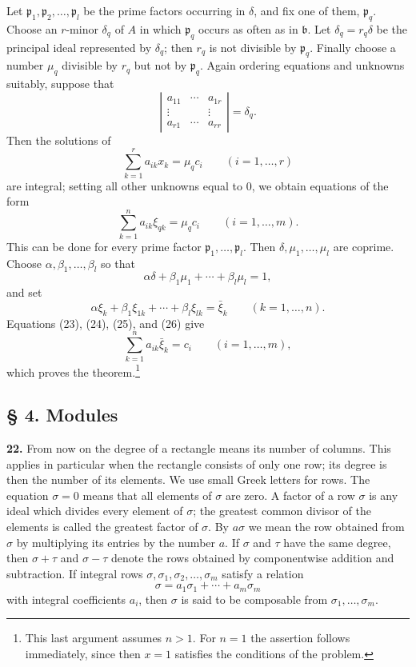 \documentclass[11pt,a4paper]{article}
\begin{document}
Let \(\mathfrak p_1,\mathfrak p_2,\ldots,\mathfrak p_l\) be the prime factors occurring in \(\delta\), and fix one of them, \(\mathfrak p_q\). Choose an \(r\)-minor \(\delta_q\) of \(A\) in which \(\mathfrak p_q\) occurs as often as in \(\mathfrak b\). Let \(\delta_q=r_q\delta\) be the principal ideal represented by \(\delta_q\); then \(r_q\) is not divisible by \(\mathfrak p_q\). Finally choose a number \(\mu_q\) divisible by \(r_q\) but not by \(\mathfrak p_q\). Again ordering equations and unknowns suitably, suppose that
\[
 \left|\begin{array}{ccc}
 a_{11}&\cdots&a_{1r}\\
 \vdots&&\vdots\\
 a_{r1}&\cdots&a_{rr}
 \end{array}\right|=\delta_q .
\]
Then the solutions of
\[
 \sum_{k=1}^{r}a_{ik}x_k=\mu_q c_i\qquad(i=1,\ldots,r)
\]
are integral; setting all other unknowns equal to \(0\), we obtain equations of the form
\[
 \sum_{k=1}^{n}a_{ik}\xi_{qk}=\mu_q c_i\qquad(i=1,\ldots,m). \tag{24}
\]
This can be done for every prime factor \(\mathfrak p_1,\ldots,\mathfrak p_l\). Then \(\delta,\mu_1,\ldots,\mu_l\) are coprime. Choose \(\alpha,\beta_1,\ldots,\beta_l\) so that
\[
 \alpha\delta+\beta_1\mu_1+\cdots+\beta_l\mu_l=1, \tag{25}
\]
and set
\[
 \alpha\xi_k+\beta_1\xi_{1k}+\cdots+\beta_l\xi_{lk}=\bar\xi_k
 \qquad(k=1,\ldots,n). \tag{26}
\]
Equations (23), (24), (25), and (26) give
\[
 \sum_{k=1}^{n}a_{ik}\bar\xi_k=c_i\qquad(i=1,\ldots,m), \tag{27}
\]
which proves the theorem.\footnote{This last argument assumes \(n>1\). For \(n=1\) the assertion follows immediately, since then \(x=1\) satisfies the conditions of the problem.}

\subsection*{§ 4. Modules}

\textbf{22.} From now on the degree of a rectangle means its number of columns. This applies in particular when the rectangle consists of only one row; its degree is then the number of its elements. We use small Greek letters for rows. The equation \(\sigma=0\) means that all elements of \(\sigma\) are zero. A factor of a row \(\sigma\) is any ideal which divides every element of \(\sigma\); the greatest common divisor of the elements is called the greatest factor of \(\sigma\). By \(a\sigma\) we mean the row obtained from \(\sigma\) by multiplying its entries by the number \(a\). If \(\sigma\) and \(\tau\) have the same degree, then \(\sigma+\tau\) and \(\sigma-\tau\) denote the rows obtained by componentwise addition and subtraction. If integral rows \(\sigma,\sigma_1,\sigma_2,\ldots,\sigma_m\) satisfy a relation
\[
 \sigma=a_1\sigma_1+\cdots+a_m\sigma_m
\]
with integral coefficients \(a_i\), then \(\sigma\) is said to be composable from \(\sigma_1,\ldots,\sigma_m\).
\end{document}
